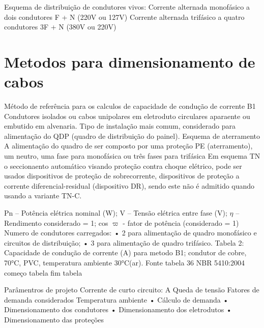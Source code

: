 %
%
%



Esquema de distribuição de condutores vivos:
Corrente alternada monofásico a dois condutores F + N (220V ou 127V)
Corrente alternada trifásico a quatro condutores 3F + N (380V ou 220V)

\section{Metodos para dimensionamento de cabos}

 Método de referência para os calculos de capacidade de condução de corrente
B1
Condutores isolados ou cabos unipolares em eletroduto circulares aparaente ou embutido em alvenaria. Tipo de instalação mais comum, considerado para alimentação do QDP (quadro de distribuição do painel).
Esquema de aterramento
A alimentação do quadro de ser composto por uma proteção PE (aterramento), um neutro,  uma fase para monofásica ou três fases para trifásica
Em esquema TN o seccionaento automático visando proteção contra choque elétrico, pode ser usados dispositivos de proteção de sobrecorrente, dispositivos de proteção a corrente diferencial-residual (dispositivo DR), sendo este não é admitido quando usando a variante TN-C.


Pn – Potência elétrica nominal (W);
V – Tensão elétrica entre fase (V);
$\eta$ – Rendimento considerado = 1;
cos $\varpi$ -  fator de potência (considerado = 1)
Numero de condutores carregados:
    • 2 para alimentação de quadro monofásico e circuitos de distribuição;
    • 3 para alimentação de quadro trifásico.
Tabela 2: Capacidade de condução de corrente (A) para metodo B1; condutor de cobre, 70°C, PVC, temperatura ambiente 30°C(ar). Fonte tabela 36 NBR 5410:2004
começo tabela
fim tabela

    Parâmentros de projeto
        Corrente de curto circuito:   A
        Queda de tensão
        Fatores de demanda considerados
        Temperatura ambiente
    • Cálculo de demanda
    • Dimensionamento dos condutores
    • Dimensionamento dos eletrodutos
    • Dimensionamento das proteções
